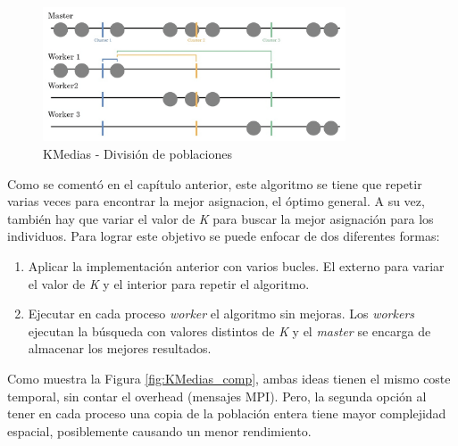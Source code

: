 		
		\begin{figure} [!h]
			\centering
			\includegraphics[width=0.8\textwidth]{images/chapter_3/kmedias_mpi}	
			\caption{KMedias - División de poblaciones}
			\label{fig:kmediasdiv}
		\end{figure}
		
		\vspace{0.2cm}
		
		Como se comentó en el capítulo anterior, este algoritmo se tiene que repetir varias veces para encontrar la mejor asignacion, el óptimo general. A su vez, también hay que variar el valor de \textit{K} para buscar la mejor asignación para los individuos. Para lograr este objetivo se puede enfocar de dos diferentes formas:
		
		\begin{enumerate}
			\item Aplicar la implementación anterior con varios bucles. El externo para variar el valor de \textit{K} y el interior para repetir el algoritmo.
			\item Ejecutar en cada proceso \textit{worker} el algoritmo sin mejoras. Los \textit{workers} ejecutan la búsqueda con valores distintos de \textit{K} y el \textit{master} se encarga de almacenar los mejores resultados.
		\end{enumerate}
		
		Como muestra la Figura \ref{fig:KMedias_comp}, ambas ideas tienen el mismo coste temporal, sin contar el overhead (mensajes MPI). Pero, la segunda opción al tener en cada proceso una copia de la población entera tiene mayor complejidad espacial, posiblemente causando un menor rendimiento.
		
